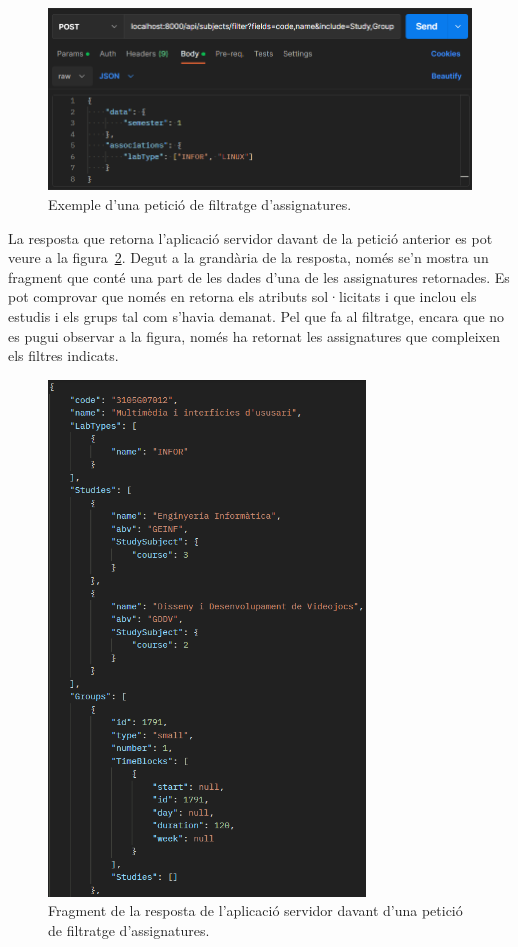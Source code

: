 \documentclass[a4paper,12pt]{ThesisStyle}
\begin{document}
\begin{figure}[H]
  \centering
  \includegraphics[width=\textwidth]{assets/proves/peticioSubjects.png}
  \caption{\label{img:peticioSubjects} Exemple d'una petició de filtratge d'assignatures.}
\end{figure}

La resposta que retorna l'aplicació servidor davant de la petició anterior es pot veure a la figura~\ref{img:respostaSubjects}. Degut a la grandària de la resposta, només se'n mostra un fragment que conté una part de les dades d'una de les assignatures retornades. Es pot comprovar que només en retorna els atributs sol·licitats i que inclou els estudis i els grups tal com s'havia demanat. Pel que fa al filtratge, encara que no es pugui observar a la figura, només ha retornat les assignatures que compleixen els filtres indicats.

\begin{figure}[H]
  \centering
  \includegraphics[width=0.75\textwidth]{assets/proves/respostaSubjects.png}
  \caption{\label{img:respostaSubjects} Fragment de la resposta de l'aplicació servidor davant d'una petició de filtratge d'assignatures.}
\end{figure}
\end{document}
